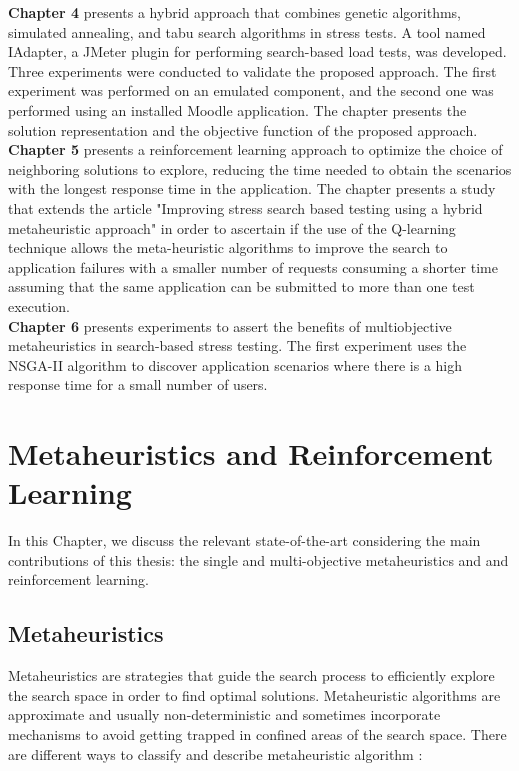 \documentclass[espaco=umemeio,chapter=TITLE,twoside,openright]{abnt}
\begin{document}
\textbf{Chapter 4} presents a hybrid approach that combines genetic algorithms, simulated annealing, and tabu search algorithms in stress tests. A tool named IAdapter, a JMeter plugin for performing search-based load tests, was developed. Three experiments were conducted to validate the proposed approach. The first experiment was performed on an emulated component, and the second one was performed using an installed Moodle application. The chapter presents the solution representation and the objective function of the proposed approach.
\\

\textbf{Chapter 5} presents a reinforcement learning approach to optimize the choice of neighboring solutions to explore, reducing the time needed to obtain the scenarios with the longest response time in the application. The chapter presents a study that extends the article "Improving stress search based testing using a hybrid metaheuristic approach"  in order to ascertain if the use of the Q-learning technique allows the meta-heuristic algorithms to improve the search to application failures with a smaller number of requests consuming a shorter time assuming that the same application can be submitted to more than one test execution.
\\

\textbf{Chapter 6} presents experiments to assert the benefits of multiobjective metaheuristics in search-based stress testing. The first experiment uses the NSGA-II algorithm to discover application scenarios where there is a high response time for a small number of users. 

\chapter{Metaheuristics and Reinforcement Learning}

In this Chapter, we discuss the relevant state-of-the-art considering the main contributions
of this thesis: the single and multi-objective metaheuristics and and reinforcement learning.

\section{Metaheuristics}

Metaheuristics are strategies that guide the search process to efficiently explore the search space in order to find optimal solutions. Metaheuristic algorithms are approximate and usually non-deterministic and sometimes incorporate mechanisms to avoid getting trapped in confined areas of the search space. There are different ways to classify and describe metaheuristic algorithm \cite{Blum2003}:
\end{document}
